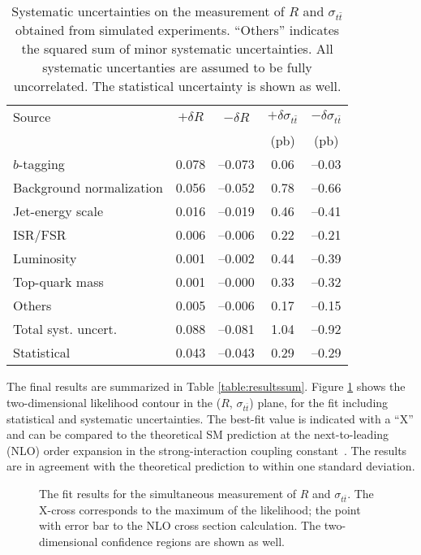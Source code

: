 \documentclass[aps,prd,twocolumn,superscriptaddress,showpacs]{revtex4}
\begin{document}
\begin{table}
\caption{Systematic uncertainties on the measurement of $R$ and $\sigma_{t\bar{t}}$
obtained from simulated experiments. ``Others'' indicates the squared sum of minor systematic uncertainties.
All systematic uncertanties are assumed to be fully uncorrelated. The statistical uncertainty is shown as well.}
\begin{tabular}{lcccc}
\hline \hline
Source     &$+\delta R$&$-\delta R$&$+\delta\sigma_{t\bar{t}}$&$-\delta\sigma_{t\bar{t}}$\\
                         &           &           & (pb)      &    (pb)\\
\hline
$b$-tagging      &0.078  &--0.073  &0.06  &--0.03\\
Background normalization&0.056&--0.052&0.78&--0.66\\
Jet-energy scale & 0.016 & --0.019 & 0.46 &--0.41\\
ISR/FSR          &0.006  & --0.006 &0.22  &--0.21\\
Luminosity&0.001&--0.002&0.44&--0.39\\
Top-quark mass&0.001&--0.000&0.33&--0.32\\
Others & 0.005 & --0.006 & 0.17 & --0.15 \\
\hline
Total syst. uncert. &   0.088 & --0.081 & 1.04 & --0.92 \\
\hline
Statistical&                0.043    &   --0.043    &     0.29     &  --0.29         \\
\hline
\hline
\end{tabular}
\centering
\label{table:systematics}
\end{table}


The final results 
are  summarized in Table \ref{table:resultssum}. 
 Figure \ref{fig:contorni}  shows the two-dimensional likelihood contour in the 
($R$, $\sigma_{t\bar{t}}$) plane, for the  fit including statistical and systematic 
uncertainties. 
The best-fit value is indicated with a ``X'' and can be 
compared to the theoretical SM prediction at the next-to-leading (NLO) order expansion in the strong-interaction 
coupling constant~\cite{topxsec}. 
The results are in agreement with the theoretical prediction to within one standard deviation.


\begin{figure}[tbh]
\begin{center}
\caption{The fit results for the simultaneous measurement of $R$ and $\sigma_{ t\bar{t}}$.
The X-cross corresponds to the  maximum of the likelihood; the point with error bar to the NLO cross section calculation. 
The two-dimensional confidence regions are  shown as well.}
\label{fig:contorni}
\end{center}
\end{figure}
\end{document}
